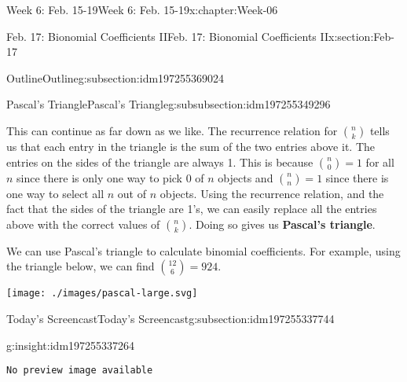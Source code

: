 \documentclass[oneside,10pt,]{book}
\newcommand{\mono}[1]{\texttt{#1}}
\newcommand{\terminology}[1]{\textbf{#1}}
\numberwithin{equation}{section}
\newlength{\qrsize}
\newlength{\previewwidth}
\begin{document}
\begin{chapterptx}{Week 6: Feb. 15-19}{}{Week 6: Feb. 15-19}{}{}{x:chapter:Week-06}
\begin{sectionptx}{Feb. 17: Bionomial Coefficients II}{}{Feb. 17: Bionomial Coefficients II}{}{}{x:section:Feb-17}
\begin{subsectionptx}{Outline}{}{Outline}{}{}{g:subsection:idm197255369024}
\begin{subsubsectionptx}{Pascal's Triangle}{}{Pascal's Triangle}{}{}{g:subsubsection:idm197255349296}
\begin{sidebyside}{1}{0.15}{0.15}{0}
\end{sidebyside}%
\par
This can continue as far down as we like. The recurrence relation for \({n \choose k}\) tells us that each entry in the triangle is the sum of the two entries above it. The entries on the sides of the triangle are always 1. This is because \({n \choose 0} = 1\) for all \(n\) since there is only one way to pick 0 of \(n\) objects and \({n \choose n} = 1\) since there is one way to select all \(n\) out of \(n\) objects. Using the recurrence relation, and the fact that the sides of the triangle are 1's, we can easily replace all the entries above with the correct values of \({n \choose k}\). Doing so gives us \terminology{Pascal's triangle}. %
\par
We can use Pascal's triangle to calculate binomial coefficients. For example, using the triangle below, we can find \({12 \choose 6} = 924\).%
\begin{sidebyside}{1}{0}{0}{0}%
\begin{sbspanel}{1}%
\texttt{[image: ./images/pascal-large.svg]}
\end{sbspanel}%
\end{sidebyside}%
\end{subsubsectionptx}
\end{subsectionptx}
%
%
\typeout{************************************************}
\typeout{************************************************}
%
\begin{subsectionptx}{Today's Screencast}{}{Today's Screencast}{}{}{g:subsection:idm197255337744}
\begin{insight}{}{g:insight:idm197255337264}%
\setlength{\qrsize}{9em}
\setlength{\previewwidth}{\linewidth}
\addtolength{\previewwidth}{-\qrsize}
\begin{tcbraster}[raster columns=2, raster column skip=1pt, raster halign=center, raster force size=false, raster left skip=0pt, raster right skip=0pt]%
\begin{tcolorbox}[previewstyle, width=\previewwidth]%
\mono{No preview image available}%
\end{tcolorbox}%
\begin{tcolorbox}[qrstyle]%
[QR LINK]\end{tcolorbox}%
\end{tcbraster}%
\end{insight}
\end{subsectionptx}
%
%
\typeout{************************************************}

\end{sectionptx}
\end{chapterptx}
\end{document}

